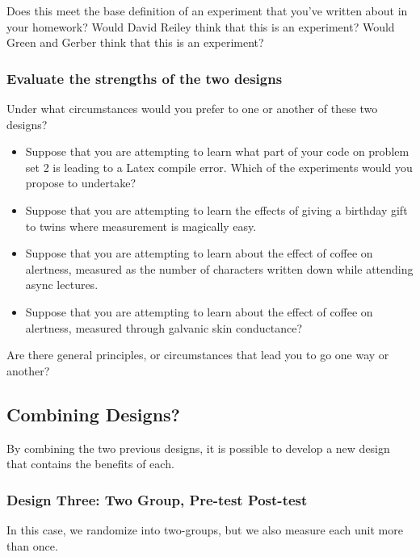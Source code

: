 \documentclass[
]{article}
\providecommand{\tightlist}{%
  \setlength{\itemsep}{0pt}\setlength{\parskip}{0pt}}
\theoremstyle{definition}
\theoremstyle{definition}
\theoremstyle{definition}
\theoremstyle{definition}
\theoremstyle{remark}
\begin{document}
Does this meet the base definition of an experiment that you've written about in your homework? Would David Reiley think that this is an experiment? Would Green and Gerber think that this is an experiment?

\subsubsection{Evaluate the strengths of the two designs}\label{evaluate-the-strengths-of-the-two-designs}

Under what circumstances would you prefer to one or another of these two designs?

\begin{itemize}
\tightlist
\item
  Suppose that you are attempting to learn what part of your code on problem set 2 is leading to a Latex compile error. Which of the experiments would you propose to undertake?
\item
  Suppose that you are attempting to learn the effects of giving a birthday gift to twins where measurement is magically easy.
\item
  Suppose that you are attempting to learn about the effect of coffee on alertness, measured as the number of characters written down while attending async lectures.
\item
  Suppose that you are attempting to learn about the effect of coffee on alertness, measured through galvanic skin conductance?
\end{itemize}

Are there general principles, or circumstances that lead you to go one way or another?

\subsection{Combining Designs?}\label{combining-designs}

By combining the two previous designs, it is possible to develop a new design that contains the benefits of each.

\subsubsection{Design Three: Two Group, Pre-test Post-test}\label{design-three-two-group-pre-test-post-test}

In this case, we randomize into two-groups, but we also measure each unit more than once.
\end{document}
